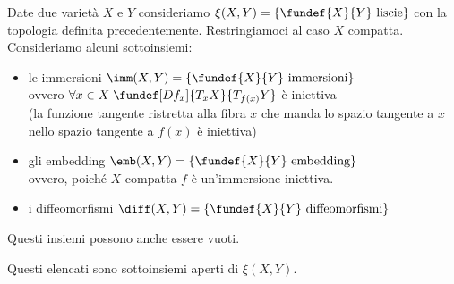 


Date due varietà $X$ e $Y$ consideriamo $\xi(X,Y)=\{ \fundef{X}{Y}\text{ liscie} \} $ con la topologia definita precedentemente. Restringiamoci al caso $X$ compatta. Consideriamo alcuni sottoinsiemi:
\begin{itemize}
\item le immersioni $\imm(X,Y) =\{\fundef{X}{Y}\text{ immersioni}\}$\\ovvero $\forall x \in X \; \fundef[Df_x]{T_xX}{T_{f(x)}Y}$ è iniettiva \\(la funzione tangente ristretta alla fibra $x$ che manda lo spazio tangente a $x$ nello spazio tangente a $f(x)$ è iniettiva)
\item gli embedding $\emb(X,Y)=\{\fundef{X}{Y}\text{ embedding}\}$\\ovvero, poiché $X$ compatta $f$ è un'immersione iniettiva.
\item i diffeomorfismi $\diff(X,Y)=\{\fundef{X}{Y}\text{ diffeomorfismi}\}$
\end{itemize}

\begin{oss}
Questi insiemi possono anche essere vuoti.
\end{oss}

\begin{teo}
Questi elencati sono sottoinsiemi aperti di $\xi(X,Y)$.
\end{teo}

